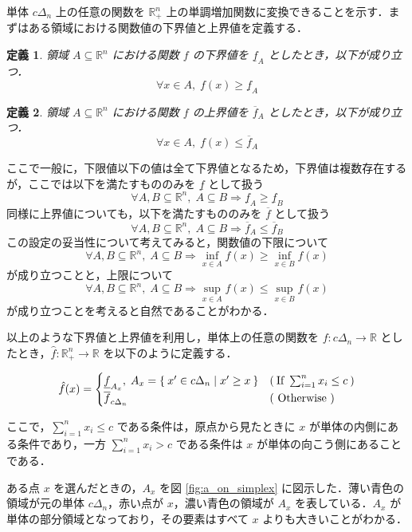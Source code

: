 \documentclass[a4paper,11pt]{jreport}
\newtheorem{definition}{定義}
\begin{document}
単体 $ c \Delta_n $ 上の任意の関数を $ \mathbb{R}_+^n $ 上の単調増加関数に変換できることを示す．まずはある領域における関数値の下界値と上界値を定義する．

\begin{definition}
領域 $ A \subseteq \mathbb{R}^n $ における関数 $ f $ の下界値を $ \underline{f}_A $ としたとき，以下が成り立つ．
$$ \forall x \in A, \; f(x) \geq \underline{f}_A $$
\end{definition}

\begin{definition}
領域 $ A \subseteq \mathbb{R}^n $ における関数 $ f $ の上界値を $ \overline{f}_A $ としたとき，以下が成り立つ．
$$ \forall x \in A, \; f(x) \leq \overline{f}_A $$
\end{definition}

ここで一般に，下限値以下の値は全て下界値となるため，下界値は複数存在するが，ここでは以下を満たすもののみを $ \underline{f} $ として扱う
$$ \forall A, B \subseteq \mathbb{R}^n, \; A \subseteq B \Rightarrow \underline{f}_A \geq \underline{f}_B $$
同様に上界値についても，以下を満たすもののみを $ \overline{f} $ として扱う
$$ \forall A, B \subseteq \mathbb{R}^n, \; A \subseteq B \Rightarrow \overline{f}_A \leq \overline{f}_B $$
この設定の妥当性について考えてみると，関数値の下限について
$$ \forall A, B \subseteq \mathbb{R}^n, \; A \subseteq B \Rightarrow \inf_{x \in A}f(x) \geq \inf_{x \in B}f(x) $$
が成り立つことと，上限について
$$ \forall A, B \subseteq \mathbb{R}^n, \; A \subseteq B \Rightarrow \sup_{x \in A}f(x) \leq \sup_{x \in B}f(x) $$
が成り立つことを考えると自然であることがわかる．\par
以上のような下界値と上界値を利用し，単体上の任意の関数を $ f : c \Delta_n \to \mathbb{R} $ としたとき，$ \hat{f} : \mathbb{R}_+^n \to \mathbb{R} $ を以下のように定義する．

\begin{align*}
\hat{f}(x) =
\begin{cases}
\underline{f}_{A_x}, \; A_x = \Set{x' \in c \Delta_n | x' \geq x } & ( \: \mbox{If } \sum_{i=1}^{n}x_i \leq c \: ) \\
\overline{f}_{c \Delta_n} & (\mbox{ Otherwise })
\end{cases}
\end{align*}

ここで，$ \sum_{i=1}^{n}x_i \leq c $ である条件は，原点から見たときに $ x $ が単体の内側にある条件であり，一方 $ \sum_{i=1}^{n}x_i > c $ である条件は $ x $ が単体の向こう側にあることである．\par
ある点 $ x $ を選んだときの，$ A_x $ を図 \ref{fig:a_on_simplex} に図示した．薄い青色の領域が元の単体 $ c \Delta_n $，赤い点が $ x $，濃い青色の領域が $ A_x $ を表している．$ A_x $ が単体の部分領域となっており，その要素はすべて $ x $ よりも大きいことがわかる．\par
\end{document}
